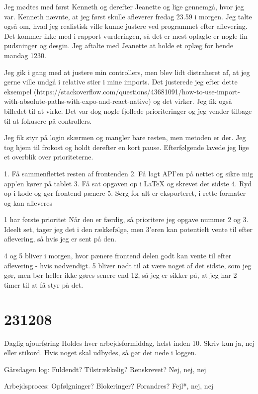 \documentclass{report}
\begin{document}
Jeg mødtes med først Kenneth og derefter Jeanette og lige gennemgå, hvor jeg var.
Kenneth nævnte, at jeg først skulle afleverer fredag 23.59 i morgen.
Jeg talte også om, hvad jeg realistisk ville kunne justere ved programmet efter aflevering. Det kommer ikke med i rapport vurderingen, så det er mest oplagte er nogle fin pudsninger og desgin.
Jeg aftalte med Jeanette at holde et oplæg for hende mandag 1230.

Jeg gik i gang med at justere min controllers, men blev lidt distraheret af, at jeg gerne ville undgå i relative stier i mine imports. Det justerede jeg efter dette eksempel (https://stackoverflow.com/questions/43681091/how-to-use-import-with-absolute-paths-with-expo-and-react-native) og det virker. Jeg fik også billedet til at virke.
Det var dog nogle fjollede prioriteringer og jeg vender tilbage til at fokusere på controllers.

Jeg fik styr på login skærmen og mangler bare resten, men metoden er der. Jeg tog hjem til frokost og holdt derefter en kort pause.
Efterfølgende lavede jeg lige et overblik over prioriteterne.

	1. Få sammenflettet resten af frontenden
	2. Få lagt API'en på nettet og sikre mig app'en kører på tablet
	3. Få sat opgaven op i LaTeX og skrevet det sidste
	4. Ryd op i kode og gør frontend pænere
	5. Sørg for alt er eksporteret, i rette formater og kan afleveres

1 har første prioritet
Når den er færdig, så prioritere jeg opgave nummer 2 og 3. Ideelt set, tager jeg det i den rækkefølge, men 3'eren kan potentielt vente til efter aflevering, så hvis jeg er sent på den.

4 og 5 bliver i morgen, hvor pænere frontend delen godt kan vente til efter aflevering - hvis nødvendigt.
5 bliver nødt til at være noget af det sidste, som jeg gør, men bør heller ikke gøres senere end 12, så jeg er sikker på, at jeg har 2 timer til at få styr på det.


\section{231208}
Daglig ajourføring
Holdes hver arbejdsformiddag, helst inden 10. Skriv kun ja, nej eller stikord. Hvis noget skal udbydes, så gør det nede i loggen.

Gårsdagen log: Fuldendt? Tilstrækkelig? Renskrevet?
Nej, nej, nej

Arbejdsproces: Opfølgninger? Blokeringer? Forandres?
Fejl*, nej, nej
\end{document}
